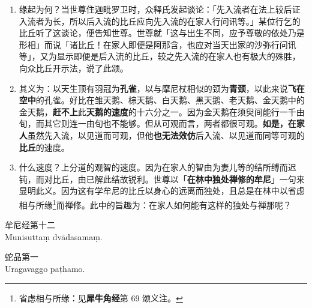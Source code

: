 \begin{enumerate}\item 缘起为何？当世尊住迦毗罗卫时，众释氏发起谈论：「先入流者在法上较后证入流者为长，所以后入流的比丘应向先入流的在家人行问讯等。」某位行乞的比丘听了这谈论，便告知世尊。世尊就「这与出生不同，应予尊敬的依处乃是形相」而说「诸比丘！在家人即便是阿那含，也应对当天出家的沙弥行问讯等」，又为显示即便是后入流的比丘，较之先入流的在家人也有极大的殊胜，向众比丘开示法，说了此颂。
\item 其义为：以天生顶有羽冠为\textbf{孔雀}，以与摩尼杖相似的颈为\textbf{青颈}，以此来说\textbf{飞在空中}的孔雀。好比在雏天鹅、棕天鹅、白天鹅、黑天鹅、老天鹅、金天鹅中的金天鹅，\textbf{赶不上}此\textbf{天鹅的速度}的十六分之一。因为金天鹅在须臾间能行一千由旬，而其它则连一由旬也不能够。但从可观而言，两者都很可观。\textbf{如是，在家人}虽然先入流，以见道而可观，但他\textbf{也无法效仿}后入流、以见道而同等可观的\textbf{比丘}的速度。
\item 什么速度？上分道的观智的速度。因为在家人的智由为妻儿等的结所缚而迟钝，而对比丘，由已解此结故锐利。世尊以「\textbf{在林中独处禅修的牟尼}」一句来显明此义。因为这有学牟尼的比丘以身心的远离而独处，且总是在林中以省虑相与所缘\footnote{省虑相与所缘：见\textbf{犀牛角经}第 69 颂义注。}而禅修。此中的旨趣为：在家人如何能有这样的独处与禅那呢？\end{enumerate}

\begin{center}\vspace{1em}牟尼经第十二\\Munisuttaṃ dvādasamaṃ.\end{center}

\begin{center}\vspace{1em}蛇品第一\\Uragavaggo paṭhamo.\end{center}

